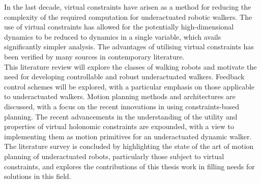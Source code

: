 In the last decade, virtual constraints have arisen as a method for reducing the complexity of the required computation for underactuated robotic walkers. The use of virtual constraints has allowed for the potentially high-dimensional dynamics to be reduced to dynamics in a single variable, which avails significantly simpler analysis. The advantages of utilising virtual constraints has been verified by many sources in contemporary literature. \\

This literature review will explore the classes of walking robots and motivate the need for developing controllable and robust underactuated walkers. Feedback control schemes will be explored, with a particular emphasis on those applicable to underactuated walkers. Motion planning methods and architectures are discussed, with a focus on the recent innovations in using constraints-based planning. The recent advancements in the understanding of the utility and properties of virtual holonomic constraints are expounded, with a view to implementing them as motion primitives for an underactuated dynamic walker. The literature survey is concluded by highlighting the state of the art of motion planning of underactuated robots, particularly those subject to virtual constraints, and explores the contributions of this thesis work in filling needs for solutions in this field.